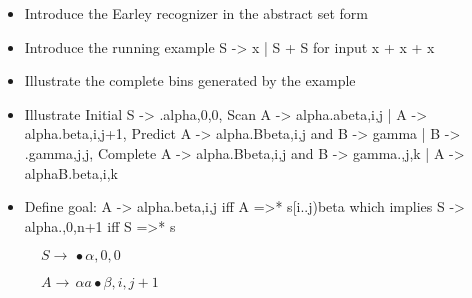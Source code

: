 %
\begin{isabellebody}%
%
%
\isadelimtheory
%
\endisadelimtheory
%
\isatagtheory
%
\endisatagtheory
{\isafoldtheory}%
%
\isadelimtheory
%
\endisadelimtheory
%
\isadelimdocument
%
\endisadelimdocument
%
\isatagdocument
%
\isamarkuptrue%
%
\isamarkuptrue%
%
\endisatagdocument
{\isafolddocument}%
%
\isadelimdocument
%
\endisadelimdocument
%
\begin{isamarkuptext}%
\begin{itemize}
    \item Introduce the Earley recognizer in the abstract set form \\
    \item Introduce the running example S -> x | S + S for input x + x + x \\
    \item Illustrate the complete bins generated by the example \\
    \item Illustrate Initial S -> .alpha,0,0, Scan A -> alpha.abeta,i,j | A -> alpha.beta,i,j+1,
      Predict A -> alpha.Bbeta,i,j and B -> gamma | B -> .gamma,j,j,
      Complete A -> alpha.Bbeta,i,j and B -> gamma.,j,k | A -> alphaB.beta,i,k \\
    \item Define goal: A -> alpha.beta,i,j iff A =>* s[i..j)beta which implies S -> alpha.,0,n+1 iff S =>* s \\
  \end{itemize}%
\end{isamarkuptext}\isamarkuptrue%
%
\isadelimdocument
%
\endisadelimdocument
%
\isatagdocument
%
\isamarkuptrue%
%
\endisatagdocument
{\isafolddocument}%
%
\isadelimdocument
%
\endisadelimdocument
%
\begin{isamarkuptext}%
\begin{figure}[htpb]
    \centering

    \begin{mathpar}
      \inferrule [Init]
      {\\}
      {$S \rightarrow \, \bullet\alpha, 0, 0$}
  
      {$A \rightarrow \, \alpha a \bullet \beta, i, j+1$}
  

\end{mathpar}
\end{figure}
\end{isamarkuptext}
\end{isabellebody}
